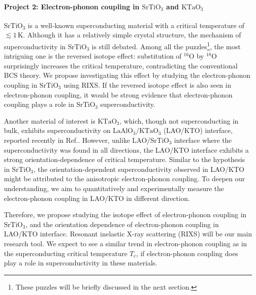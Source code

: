 \documentclass[11pt]{article}
\begin{document}
\paragraph{Project 2: Electron-phonon coupling in $\mathrm{SrTiO_{3}}$ and $\mathrm{KTaO_{3}}$} 
$\mathrm{SrTiO_{3}}$ is a well-known superconducting material with a critical temperature of $\lesssim 1\, \mathrm{K}$\cite{schooley_superconductivity_1964,lin_fermi_2013}. Although it has a  relatively simple crystal structure, the mechanism of superconductivity in $\mathrm{SrTiO_{3}}$ is still debated. Among all the puzzles\footnote{These puzzles will be briefly discussed in the next section.}, the most intriguing one is the reversed isotope effect: substitution of ${}^{16}\mathrm{O}$ by ${}^{18}\mathrm{O}$ surprisingly increases the critical temperature, contradicting the conventional BCS theory\cite{stucky_isotope_2016}. We propose investigating this effect by studying the electron-phonon coupling in $\mathrm{SrTiO_{3}}$ using RIXS. If the reversed isotope effect is also seen in electron-phonon coupling, it would be strong evidence that electron-phonon coupling plays a role in $\mathrm{SrTiO_{3}}$ superconductivity.

Another material of interest is $\mathrm{KTaO_{3}}$, which, though not superconducting in bulk, exhibits superconductivity on $\mathrm{LaAlO_{3}/KTaO_{3}}$ (LAO/KTO) interface, reported recently in Ref.\cite{ren_two-dimensional_2022}. However, unlike LAO/$\mathrm{SrTiO_{3}}$ interface where the superconductivity was found in all directions, the LAO/KTO interface exhibits a strong orientation-dependence of critical temperature\cite{ren_two-dimensional_2022,chen_two-dimensional_2021}. Similar to the hypothesis in $\mathrm{SrTiO_{3}}$, the orientation-dependent superconductivity observed in LAO/KTO might be attributed to the anisotropic electron-phonon coupling. To deepen our understanding, we aim to quantitatively and experimentally measure the electron-phonon coupling in LAO/KTO in different direction. 

Therefore, we propose studying the isotope effect of electron-phonon coupling in $\mathrm{SrTiO_{3}}$, and the orientation dependence of electron-phonon coupling in LAO/KTO interface. Resonant inelastic X-ray scattering (RIXS) will be our main research tool. We expect to see a similar trend in electron-phonon coupling as in the superconducting critical temperature $T_{c}$, if electron-phonon coupling does play a role in superconductivity in these materials.
\end{document}
